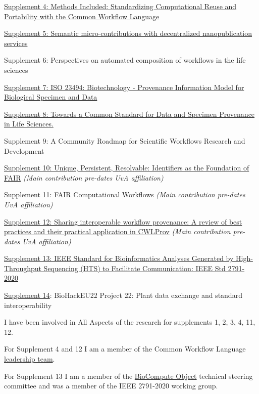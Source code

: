 \href{https://s11.no/2022/phd/methods-included/}{Supplement 4: Methods Included:
Standardizing Computational Reuse and Portability with the Common
Workflow Language} \cite{Crusoe 2022}

\href{https://s11.no/2021/phd/nanopub/}{Supplement 5: Semantic micro-contributions
with decentralized nanopublication services} \cite{Kuhn 2021}

Supplement 6:
Perspectives on automated composition of workflows in the life sciences \cite{lamprechtPerspectivesAutomatedComposition2021b}

\href{https://doi.org/10.1007/978-3-030-80960-7_16}{Supplement 7: ISO
23494: Biotechnology - Provenance Information Model for Biological
Specimen and Data}

\href{https://doi.org/10.1002/lrh2.10365}{Supplement 8: Towards a
Common Standard for Data and Specimen Provenance in Life Sciences.}

Supplement 9: A Community Roadmap for Scientific Workflows Research and Development \cite{ch6-39}

\href{https://doi.org/10.1162/dint_a_00025}{Supplement 10: Unique,
Persistent, Resolvable: Identifiers as the Foundation of FAIR} 
\emph{(Main contribution pre-dates UvA affiliation)}

Supplement 11: FAIR Computational Workflows \cite{Goble 2020} \emph{(Main contribution pre-dates UvA
affiliation)} 

\href{https://doi.org/10.1093/gigascience/giz095}{Supplement 12: Sharing
interoperable workflow provenance: A review of best practices and their
practical application in CWLProv} \cite{ch5-68} \emph{(Main contribution pre-dates UvA
affiliation)} 

\href{https://www.research.manchester.ac.uk/portal/en/publications/ieee-2791(936de52b-ac53-4f0e-9927-77fd7073e88d).html}{Supplement
13: IEEE Standard for Bioinformatics Analyses Generated by
High-Throughput Sequencing (HTS) to Facilitate Communication: IEEE Std
2791-2020} \cite{ch5-64}

\href{https://doi.org/10.37044/osf.io/c724r}{Supplement 14}: BioHackEU22 Project 22: Plant data exchange and standard interoperability

I have been involved in All Aspects of the research for supplements 1, 2,
3, 4, 11, 12.

For Supplement 4 and 12 I am a member of the Common Workflow Language
\href{https://www.commonwl.org/governance/}{leadership team}.

For Supplement 13 I am a member of the
\href{https://www.biocomputeobject.org/}{BioCompute Object} technical
steering committee and was a member of the IEEE 2791-2020 working
group.

